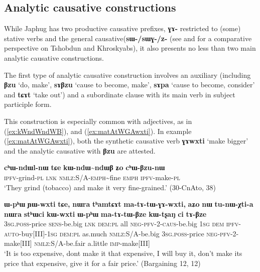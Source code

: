 \documentclass[oneside,a4paper,11pt]{article}
\newcommand{\ipa}[1]{\textbf{\phon#1}} %
\newcommand{\jpg}[2]{\ipa{#1} `#2'} %
\newcommand{\tld}{\textasciitilde{}}
\newcommand{\refb}[1]{(\ref{#1})}
\begin{document}
\subsection{Analytic causative constructions}
While Japhug has two productive causative prefixes, \ipa{ɣɤ-} restricted to (some) stative verbs and the general causative(\ipa{sɯ-/sɯɣ-/z-} (see \citealt{jacques15causative} and \citealt{jackson14morpho, lai14caus} for a comparative perspective on Tshobdun and Khroskyabs), it also presents no less than two main analytic causative constructions.

The first type of analytic causative construction involves an auxiliary (including \jpg{βzu}{do, make}, \jpg{sɤβzu}{cause to become, make},  \jpg{sɤpa}{cause to become, consider} and \jpg{tɕɤt}{take out}) and a subordinate clause with its main verb in subject participle form. 

This construction is especially common with adjectives, as in \refb{ex:kWndWndWB}, and \refb{ex:matAtWGAwxti}. In example \refb{ex:matAtWGAwxti}, both the synthetic causative verb \jpg{ɣɤwxti}{make bigger} and the analytic causative  with \ipa{βzu} are attested. 

    \begin{exe}
\ex  \label{ex:kWndWndWB}
\gll 
    \ipa{cʰɯ-ndɯl-nɯ} 	\ipa{tɕe} 	\ipa{kɯ-ndɯ\tld{}ndɯβ} 	\ipa{ʑo} 	\ipa{cʰɯ-βzu-nɯ}  \\
\textsc{ipfv}-grind-\textsc{pl} \textsc{lnk} \textsc{nmlz:S/A-emph}\tld{}fine \textsc{emph} \textsc{ipfv}-make-\textsc{pl} \\
\glt  `They grind (tobacco) and make it very fine-grained.' (30-CnAto, 38)
   \end{exe}
   
      \begin{exe}
\ex  \label{ex:matAtWGAwxti}
\gll  
   \ipa{ɯ-pʰɯ} 	\ipa{ɲɯ-wxti} 	\ipa{tɕe,} 	\ipa{nɯra} 	\ipa{tʰamtɕɤt} 	\ipa{ma-tɤ-tɯ-ɣɤ-wxti,} 	\ipa{aʑo} 	\ipa{nɯ} 	\ipa{tu-nɯ-χti-a} 	\ipa{nɯra} 	\ipa{stʰɯci} 	\ipa{kɯ-wxti} 	\ipa{ɯ-pʰɯ} 	\ipa{ma-tɤ-tɯ-βze}  \ipa{kɯ-tʂaŋ} 	\ipa{ci} 	\ipa{tɤ-βze} \\
   \textsc{3sg.poss}-price \textsc{sens}-be.big \textsc{lnk} \textsc{dem:pl} all \textsc{neg-pfv-2-caus}-be.big \textsc{1sg} \textsc{dem} \textsc{ipfv-auto}-buy[III]-\textsc{1sg}   \textsc{dem:pl} as.much \textsc{nmlz}:S/A-be.big \textsc{3sg.poss}-price \textsc{neg-pfv-2}-make[III] \textsc{nmlz}:S/A-be.fair a.little \textsc{imp}-make[III] \\
\glt  `It is too expensive, dont make it that expensive, I will buy it, don't make its price that expensive, give it for a fair price.' (Bargaining 12,  12)
   \end{exe}
\end{document}
